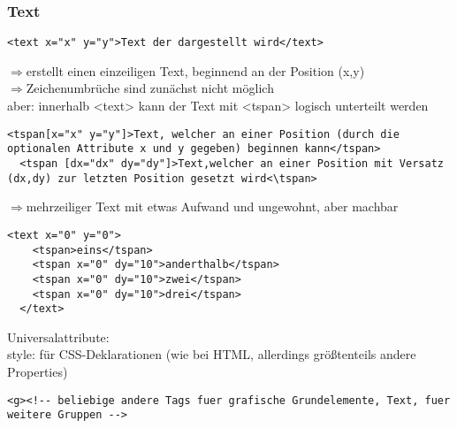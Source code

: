 \subsubsection{Text}
\begin{lstlisting}[caption={Syntax des Text-Tag}, label={lst:text-Tag}, language={SVG}]
  <text x="x" y="y">Text der dargestellt wird</text>
\end{lstlisting}
$\Rightarrow$erstellt einen einzeiligen Text, beginnend an der Position (x,y)\\
$\Rightarrow$Zeichenumbrüche sind zunächst nicht möglich\\
aber: innerhalb <text> kann der Text mit <tspan> logisch unterteilt werden
\begin{lstlisting}[caption={Syntax des Text-Tag}, label={lst:Syntax des tspan-Tag}, language={SVG}]
  <tspan[x="x" y="y"]>Text, welcher an einer Position (durch die optionalen Attribute x und y gegeben) beginnen kann</tspan>
  <tspan [dx="dx" dy="dy"]>Text,welcher an einer Position mit Versatz (dx,dy) zur letzten Position gesetzt wird<\tspan>
\end{lstlisting}
$\Rightarrow$mehrzeiliger Text mit etwas Aufwand und ungewohnt, aber machbar\\
\begin{lstlisting}[caption={Beispiel für ein tspan-Tag}, label={lst:text-Tag}, language={SVG}]
  <text x="0" y="0">
    <tspan>eins</tspan>
    <tspan x="0" dy="10">anderthalb</tspan>
    <tspan x="0" dy="10">zwei</tspan>
    <tspan x="0" dy="10">drei</tspan>
  </text>
\end{lstlisting}
Universalattribute:\\
style: für CSS-Deklarationen (wie bei HTML, allerdings größtenteils andere Properties)\\
\begin{lstlisting}[caption={Gruppierung von Inhalts-Tags bei SVG}, label={lst:text-Tag}, language={SVG}]
  <g><!-- beliebige andere Tags fuer grafische Grundelemente, Text, fuer weitere Gruppen -->
\end{lstlisting}

